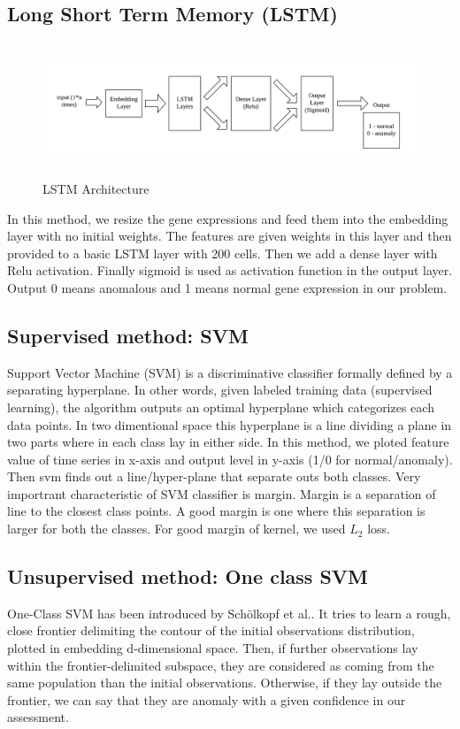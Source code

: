 \subsection{Long Short Term Memory (LSTM)}
\begin{figure}
    \centering
    \includegraphics[height=4cm]{Figures/LSTM.png}
    \caption{LSTM Architecture}
    \label{fig:lstm}
\end{figure}

In this method, we resize the gene expressions and feed them  into the embedding layer with no initial weights. The features are given weights in this layer and then provided to a basic LSTM layer with 200 cells. Then we add a dense layer with Relu activation. Finally sigmoid is used as activation function in the output layer. Output 0 means anomalous and 1 means normal gene expression in our problem.

\subsection{Supervised method: SVM}
Support Vector Machine (SVM) is a discriminative classifier formally defined by a separating hyperplane. In other words, given labeled training data (supervised learning), the algorithm outputs an optimal hyperplane which categorizes each data points. In two dimentional space this hyperplane is a line dividing a plane in two parts where in each class lay in either side. In this method, we ploted feature value of time series in x-axis and output level in y-axis (1/0 for normal/anomaly). Then svm finds out a line/hyper-plane that separate outs both classes. Very importrant characteristic of SVM classifier is margin. Margin is a separation of line to the closest class points. A good margin is one where this separation is larger for both the classes. For good margin of kernel, we used $L_2$ loss.


\subsection{Unsupervised method: One class SVM}
One-Class SVM has been introduced by Schölkopf et al.\cite{one_svm}.
It tries to learn a rough, close frontier delimiting the contour of the initial observations distribution, plotted in embedding d-dimensional space. Then, if further observations lay within the frontier-delimited subspace, they are considered as coming from the same population than the initial observations. Otherwise, if they lay outside the frontier, we can say that they are anomaly with a given confidence in our assessment.

